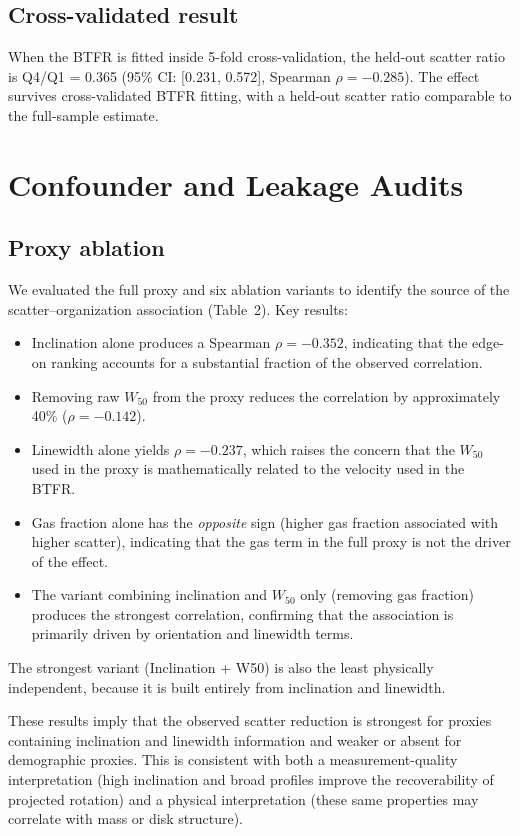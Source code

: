 \documentclass[11pt]{article}
\begin{document}
\subsection{Cross-validated result}

When the BTFR is fitted inside 5-fold cross-validation, the held-out scatter ratio is Q4/Q1 = 0.365 (95\% CI: [0.231, 0.572], Spearman $\rho = -0.285$). The effect survives cross-validated BTFR fitting, with a held-out scatter ratio comparable to the full-sample estimate.

\section{Confounder and Leakage Audits}

\subsection{Proxy ablation}

We evaluated the full proxy and six ablation variants to identify the source of the scatter--organization association (Table~2). Key results:

\begin{itemize}
\item Inclination alone produces a Spearman $\rho = -0.352$, indicating that the edge-on ranking accounts for a substantial fraction of the observed correlation.
\item Removing raw $W_{50}$ from the proxy reduces the correlation by approximately 40\% ($\rho = -0.142$).
\item Linewidth alone yields $\rho = -0.237$, which raises the concern that the $W_{50}$ used in the proxy is mathematically related to the velocity used in the BTFR.
\item Gas fraction alone has the \emph{opposite} sign (higher gas fraction associated with higher scatter), indicating that the gas term in the full proxy is not the driver of the effect.
\item The variant combining inclination and $W_{50}$ only (removing gas fraction) produces the strongest correlation, confirming that the association is primarily driven by orientation and linewidth terms.
\end{itemize}

The strongest variant (Inclination + W50) is also the least physically independent, because it is built entirely from inclination and linewidth.

These results imply that the observed scatter reduction is strongest for proxies containing inclination and linewidth information and weaker or absent for demographic proxies. This is consistent with both a measurement-quality interpretation (high inclination and broad profiles improve the recoverability of projected rotation) and a physical interpretation (these same properties may correlate with mass or disk structure).
\end{document}
